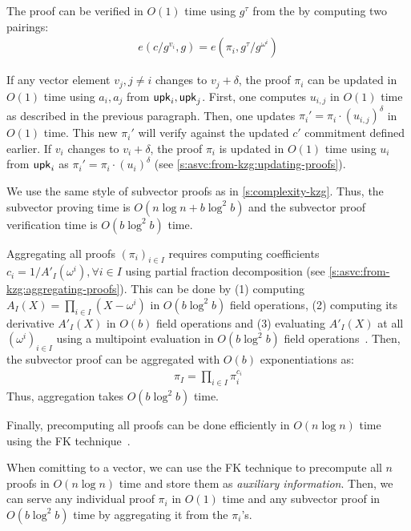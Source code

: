 The proof can be verified in $O(1)$ time using $g^\tau$ from the \vrk by computing two pairings:
\begin{align}
e(c/g^{v_i}, g) = e(\pi_i, g^{\tau}/g^{\omega^i})
\end{align}

If any vector element $v_j,j\ne i$ changes to $v_j + \delta$, the proof $\pi_i$ can be updated in $O(1)$ time using $a_i,a_j$ from $\mathsf{upk}_i,\mathsf{upk}_j$.
First, one computes $u_{i,j}$ in $O(1)$ time as described in the previous paragraph.
Then, one updates $\pi_i' = \pi_i \cdot \left(u_{i,j}\right)^{\delta}$ in $O(1)$ time.
This new $\pi_i'$ will verify against the updated $c'$ commitment defined earlier.
If $v_i$ changes to $v_i + \delta$, the proof $\pi_i$ is updated in $O(1)$ time using $u_i$ from $\mathsf{upk}_i$ as $\pi_i' = \pi_i \cdot \left(u_i\right)^{\delta}$ (see \cref{s:asvc:from-kzg:updating-proofs}).

We use the same style of subvector proofs as in \cref{s:complexity-kzg}.
Thus, the subvector proving time is $O(n\log{n}+b\log^2{b})$ and the subvector proof verification time is $O(b\log^2{b})$ time.

Aggregating all proofs $(\pi_i)_{i\in I}$ requires computing coefficients $c_i=1/A'_I(\omega^i),\forall i \in I$ using partial fraction decomposition (see \cref{s:asvc:from-kzg:aggregating-proofs}).
This can be done by (1) computing $A_I(X)=\prod_{i \in I} (X-\omega^i)$ in $O(b\log^2{b})$ field operations, (2) computing its derivative $A'_I(X)$ in $O(b)$ field operations and (3) evaluating $A'_I(X)$ at all $(\omega^i)_{i\in I}$ using a multipoint evaluation in $O(b\log^2{b})$ field operations~\cite{vG13ModernCh10}.
Then, the subvector proof can be aggregated with $O(b)$ exponentiations as:
\begin{align}
\pi_I = \prod_{i\in I}\pi_i^{c_i}
\end{align}
Thus, aggregation takes $O(b\log^2{b})$ time.

Finally, precomputing all proofs can be done efficiently in $O(n\log{n})$ time using the FK technique~\cite{FK20}.

When comitting to a vector, we can use the FK technique to precompute all $n$ proofs in $O(n\log{n})$ time and store them as \textit{auxiliary information}.
Then, we can serve any individual proof $\pi_i$ in $O(1)$ time and any subvector proof in $O(b\log^2{b})$ time by aggregating it from the $\pi_i$'s.

